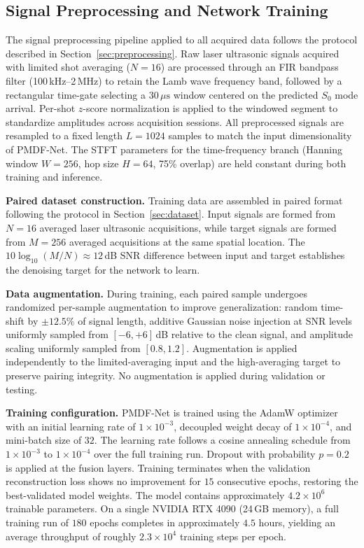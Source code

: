 \subsection{Signal Preprocessing and Network Training}
\label{sec:experiment-training}

The signal preprocessing pipeline applied to all acquired data follows the protocol described in Section~\ref{sec:preprocessing}. Raw laser ultrasonic signals acquired with limited shot averaging ($N = 16$) are processed through an FIR bandpass filter (100\,kHz--2\,MHz) to retain the Lamb wave frequency band, followed by a rectangular time-gate selecting a $30\,\mu\text{s}$ window centered on the predicted $S_0$ mode arrival. Per-shot $z$-score normalization is applied to the windowed segment to standardize amplitudes across acquisition sessions. All preprocessed signals are resampled to a fixed length $L = 1024$ samples to match the input dimensionality of PMDF-Net. The STFT parameters for the time-frequency branch (Hanning window $W = 256$, hop size $H = 64$, 75\% overlap) are held constant during both training and inference.

\textbf{Paired dataset construction.} Training data are assembled in paired format following the protocol in Section~\ref{sec:dataset}. Input signals are formed from $N = 16$ averaged laser ultrasonic acquisitions, while target signals are formed from $M = 256$ averaged acquisitions at the same spatial location. The $10\log_{10}(M/N) \approx 12$\,dB SNR difference between input and target establishes the denoising target for the network to learn.

\textbf{Data augmentation.} During training, each paired sample undergoes randomized per-sample augmentation to improve generalization: random time-shift by $\pm 12.5\%$ of signal length, additive Gaussian noise injection at SNR levels uniformly sampled from $[-6, +6]$\,dB relative to the clean signal, and amplitude scaling uniformly sampled from $[0.8, 1.2]$. Augmentation is applied independently to the limited-averaging input and the high-averaging target to preserve pairing integrity. No augmentation is applied during validation or testing.

\textbf{Training configuration.} PMDF-Net is trained using the AdamW optimizer~\cite{Loshchilov2019} with an initial learning rate of $1 \times 10^{-3}$, decoupled weight decay of $1 \times 10^{-4}$, and mini-batch size of $32$. The learning rate follows a cosine annealing schedule from $1 \times 10^{-3}$ to $1 \times 10^{-4}$ over the full training run. Dropout with probability $p = 0.2$ is applied at the fusion layers. Training terminates when the validation reconstruction loss shows no improvement for $15$ consecutive epochs, restoring the best-validated model weights. The model contains approximately $4.2 \times 10^6$ trainable parameters. On a single NVIDIA RTX 4090 (24\,GB memory), a full training run of $180$ epochs completes in approximately $4.5$ hours, yielding an average throughput of roughly $2.3 \times 10^4$ training steps per epoch.